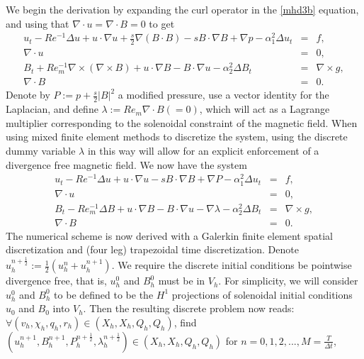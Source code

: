\documentclass[11pt]{article}%
\numberwithin{equation}{section}
\newcommand{\abs}[1]{\left\vert#1\right\vert}
\begin{document}
We begin the derivation by expanding the curl operator in the \eqref{mhd3b} equation,
and using that $\nabla \cdot u=\nabla \cdot B=0$ to get
\begin{eqnarray}
u_t - Re^{-1}\Delta u  + u\cdot\nabla u  + \frac{s}{2}\nabla(B\cdot B) - s B \cdot \nabla B + \nabla p - \alpha_1^2 \Delta u_t & = & f, \label{mhd5} \\
\nabla \cdot u & = & 0, \label{mhd6} \\
B_t + Re_m^{-1}\nabla\times(\nabla \times B) + u\cdot\nabla B - B\cdot\nabla u - \alpha_2^2 \Delta B_t & = & \nabla \times g, \label{mhd7} \\
\nabla \cdot B & = & 0. \label{mhd8}
\end{eqnarray}
Denote by $P:=p+\frac{s}{2}\abs{B}^2$ a modified pressure, use a vector identity for the Laplacian, and define $\lambda:=Re_m \nabla\cdot B (=0)$, which will
act as a Lagrange multiplier corresponding to the solenoidal constraint of the magnetic field.  
When using mixed finite element methods to discretize the system, using the discrete dummy 
variable $\lambda$ in this way will allow for an explicit enforcement of a divergence free magnetic field.  We now have the system
\begin{eqnarray}
u_t  - Re^{-1}\Delta u + u\cdot\nabla u   - s B \cdot \nabla B + \nabla P - \alpha_1^2 \Delta u_t  & = & f, \\
\nabla \cdot u & = & 0, \\
B_t - Re_m^{-1}\Delta B  + u\cdot\nabla B - B\cdot\nabla u - \nabla \lambda - \alpha_2^2 \Delta B_t & = & \nabla \times g,\\
\nabla \cdot B & = & 0.
\end{eqnarray}
The numerical scheme is now derived with a Galerkin finite element spatial discretization and (four leg)
trapezoidal time discretization.  Denote $u_h^{n+\frac12}:=\frac12(u_h^n + u_h^{n+1})$.  We require the
discrete initial conditions be pointwise divergence free, that is, $u_h^0$ and $B_h^0$ must be in $V_h$.   For simplicity,
we will consider $u_h^0$ and $B_h^0$ to be defined to be the $H^1$ projections of solenoidal initial conditions $u_0$ and $B_0$ into $V_h$.  Then the resulting discrete problem
now reads: $\forall (v_h,\chi_h,q_h,r_h) \in (X_h,X_h,Q_h,Q_h)$, find $(u_h^{n+1},B_h^{n+1},P_h^{n+\frac12},\lambda_h^{n+\frac12})
\in (X_h,X_h,Q_h,Q_h)$ for $n=0,1,2,...,M=\frac{T}{\Delta t}$,
\end{document}
